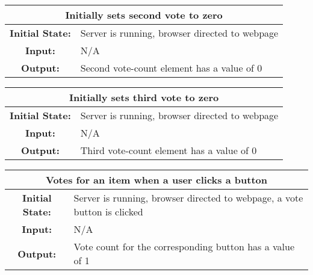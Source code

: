 \documentclass[12pt, titlepage]{article}
\begin{document}
\begin{center}
\begin{table}[H]
\begin{tabularx}{\textwidth}{| c X |}
\hline
\multicolumn{2}{|c|}{\textbf{Initially sets second vote to zero}}\\
\hline
\textbf{Initial State: } & Server is running, browser directed to webpage\\
\textbf{Input: } & N/A\\
\textbf{Output: } & Second vote-count element has a value of 0\\
\hline
\end{tabularx}
\end{table}
\end{center}


\begin{center}
\begin{table}[H]
\begin{tabularx}{\textwidth}{| c X |}
\hline
\multicolumn{2}{|c|}{\textbf{Initially sets third vote to zero}}\\
\hline
\textbf{Initial State: } & Server is running, browser directed to webpage\\
\textbf{Input: } & N/A\\
\textbf{Output: } & Third vote-count element has a value of 0\\
\hline
\end{tabularx}
\end{table}
\end{center}


\begin{center}
\begin{table}[H]
\begin{tabularx}{\textwidth}{| c X |}
\hline
\multicolumn{2}{|c|}{\textbf{Votes for an item when a user clicks a button}}\\
\hline
\textbf{Initial State: } & Server is running, browser directed to webpage, a vote button is clicked\\
\textbf{Input: } & N/A\\
\textbf{Output: } & Vote count for the corresponding button has a value of 1\\
\hline
\end{tabularx}
\end{table}
\end{center}
\end{document}
